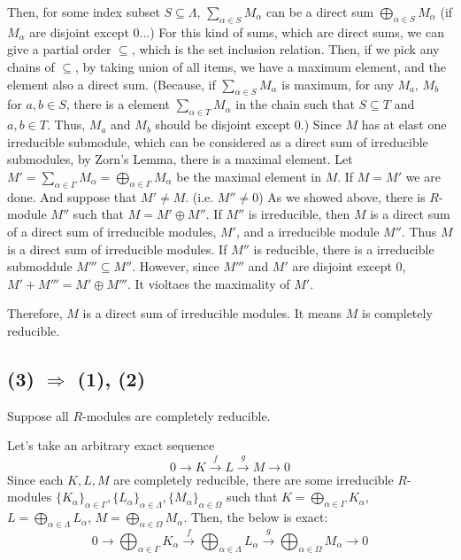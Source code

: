 Then, for some index subset \(S \subseteq \Lambda\),
\(\sum_{\alpha \in S} M_\alpha\) can be a direct sum \(\bigoplus_{\alpha \in S} M_\alpha\)
(if \(M_\alpha\) are disjoint except 0...)
For this kind of sums, which are direct sums, we can give a partial order \(\subseteq\),
which is the set inclusion relation.
Then, if we pick any chains of \(\subseteq\), by taking union of all items,
we have a maximum element,
and the element also a direct sum.
(Because, if \(\sum_{\alpha \in S} M_\alpha\) is maximum, for any \(M_a\), \(M_b\) for \(a, b \in S\),
there is a element \(\sum_{\alpha \in T} M_\alpha\) in the chain
such that \(S \subseteq T\)
and \(a, b \in T\). Thus, \(M_a\) and \(M_b\) should be disjoint except 0.)
Since \(M\) has at elast one irreducible submodule,
which can be considered as a direct sum of irreducible submodules,
by Zorn's Lemma, there is a maximal element.
Let \(M' = \sum_{\alpha \in \Gamma} M_\alpha = \bigoplus_{\alpha \in \Gamma} M_\alpha\)
be the maximal element in \(M\).
If \(M = M'\) we are done.
And suppose that \(M' \neq M\). (i.e. \(M'' \neq 0\))
As we showed above,
there is \(R\)-module \(M''\) such that \(M = M' \oplus M''\).
If \(M''\) is irreducible,
then \(M\) is a direct sum of a direct sum of irreducible modules, \(M'\), and a irreducible module \(M''\).
Thus \(M\) is a direct sum of irreducible modules.
If \(M''\) is reducible, there is a irreducible submoddule \(M''' \subseteq M''\).
However, since \(M'''\) and \(M'\) are disjoint except 0,
\(M' + M''' = M' \oplus M'''\).
It violtaes the maximality of \(M'\).

Therefore, \(M\) is a direct sum of irreducible modules.
It means \(M\) is completely reducible.
\qedsq

\subsection*{(3) \(\Rightarrow\) (1), (2)}

Suppose all \(R\)-modules are completely reducible.

Let's take an arbitrary exact sequence
\[0 \to K \xrightarrow{f} L \xrightarrow{g} M \to 0\]
Since each \(K, L, M\) are completely reducible,
there are some irreducible \(R\)-modules
\(\{K_\alpha\}_{\alpha \in \Gamma}, \{L_\alpha\}_{\alpha \in \Lambda}, \{M_\alpha\}_{\alpha \in \Omega}\)
such that
\(K = \bigoplus_{\alpha \in \Gamma} K_\alpha\),
\(L = \bigoplus_{\alpha \in \Lambda} L_\alpha\),
\(M = \bigoplus_{\alpha \in \Omega} M_\alpha\).
Then, the below is exact:
\[0 \to \bigoplus_{\alpha \in \Gamma} K_\alpha \xrightarrow{f} \bigoplus_{\alpha \in \Lambda} L_\alpha \xrightarrow{g} \bigoplus_{\alpha \in \Omega} M_\alpha \to 0\]

